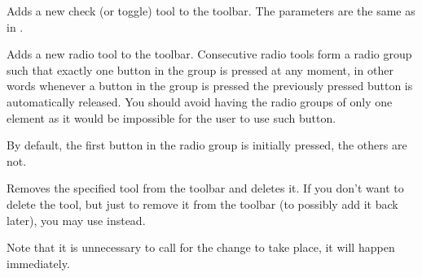 \label{wxtoolbaraddchecktool}


Adds a new check (or toggle) tool to the toolbar. The parameters are the same
as in .



\label{wxtoolbaraddradiotool}


Adds a new radio tool to the toolbar. Consecutive radio tools form a radio
group such that exactly one button in the group is pressed at any moment, in
other words whenever a button in the group is pressed the previously pressed
button is automatically released. You should avoid having the radio groups of
only one element as it would be impossible for the user to use such button.

By default, the first button in the radio group is initially pressed, the
others are not.



\label{wxtoolbardeletetool}


Removes the specified tool from the toolbar and deletes it. If you don't want
to delete the tool, but just to remove it from the toolbar (to possibly add it
back later), you may use  instead.

Note that it is unnecessary to call  for the
change to take place, it will happen immediately.

